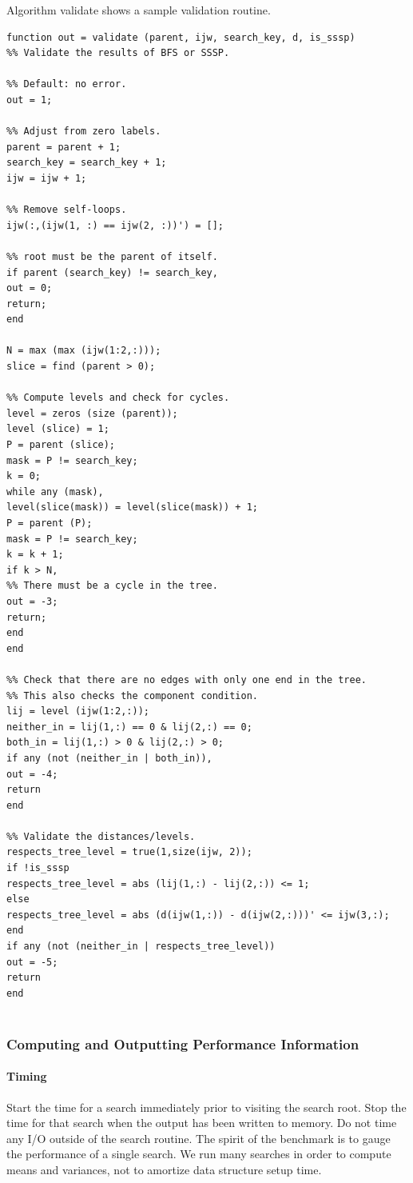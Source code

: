 \documentclass{article}
\begin{document}
Algorithm validate shows a sample validation routine.

\begin{lstlisting}
function out = validate (parent, ijw, search_key, d, is_sssp)
%% Validate the results of BFS or SSSP.

%% Default: no error.
out = 1;

%% Adjust from zero labels.
parent = parent + 1;
search_key = search_key + 1;
ijw = ijw + 1;

%% Remove self-loops.
ijw(:,(ijw(1, :) == ijw(2, :))') = [];

%% root must be the parent of itself.
if parent (search_key) != search_key,
out = 0;
return;
end

N = max (max (ijw(1:2,:)));
slice = find (parent > 0);

%% Compute levels and check for cycles.
level = zeros (size (parent));
level (slice) = 1;
P = parent (slice);
mask = P != search_key;
k = 0;
while any (mask),
level(slice(mask)) = level(slice(mask)) + 1;
P = parent (P);
mask = P != search_key;
k = k + 1;
if k > N,
%% There must be a cycle in the tree.
out = -3;
return;
end
end

%% Check that there are no edges with only one end in the tree.
%% This also checks the component condition.
lij = level (ijw(1:2,:));
neither_in = lij(1,:) == 0 & lij(2,:) == 0;
both_in = lij(1,:) > 0 & lij(2,:) > 0;
if any (not (neither_in | both_in)),
out = -4;
return
end

%% Validate the distances/levels.
respects_tree_level = true(1,size(ijw, 2));
if !is_sssp
respects_tree_level = abs (lij(1,:) - lij(2,:)) <= 1;
else
respects_tree_level = abs (d(ijw(1,:)) - d(ijw(2,:)))' <= ijw(3,:);
end
if any (not (neither_in | respects_tree_level))
out = -5;
return
end


\end{lstlisting}

\subsubsection*{Computing and Outputting Performance Information}

\paragraph*{Timing}

Start the time for a search immediately prior to visiting the search root. Stop the time for that search when the output has been written to memory. Do not time any I/O outside of the search routine. The spirit of the benchmark is to gauge the performance of a single search. We run many searches in order to compute means and variances, not to amortize data structure setup time.
\end{document}
